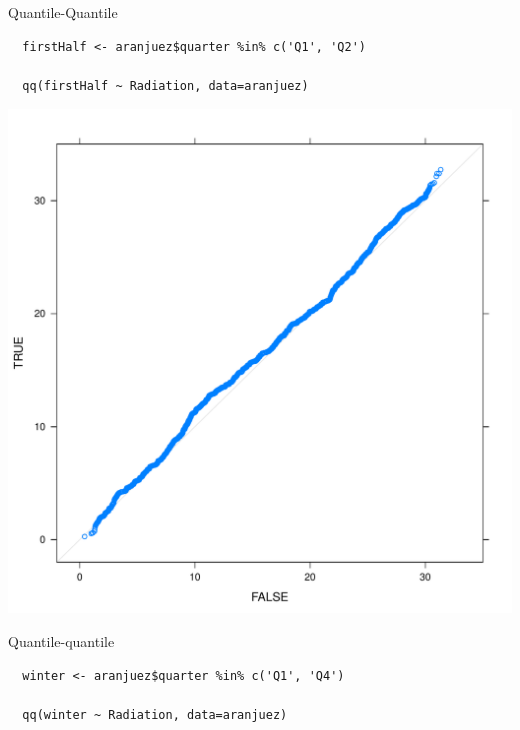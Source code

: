 \documentclass[xcolor={usenames,svgnames,dvipsnames}]{beamer}
\begin{document}
\begin{frame}[fragile,label=sec-2-1-50]{Quantile-Quantile}
 \lstset{language=R,label= ,caption= ,numbers=none}
\begin{lstlisting}
  firstHalf <- aranjuez$quarter %in% c('Q1', 'Q2')
  
  qq(firstHalf ~ Radiation, data=aranjuez)
\end{lstlisting}
\end{frame}

\begin{frame}[label=sec-2-1-51]{}
\includegraphics[width=.9\linewidth]{figs/qqHalf.pdf}
\end{frame}

\begin{frame}[fragile,label=sec-2-1-52]{Quantile-quantile}
 \lstset{language=R,label= ,caption= ,numbers=none}
\begin{lstlisting}
  winter <- aranjuez$quarter %in% c('Q1', 'Q4')
  
  qq(winter ~ Radiation, data=aranjuez)
\end{lstlisting}
\end{frame}
\end{document}
